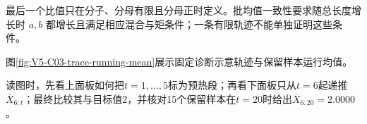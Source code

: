 \documentclass[UTF8,a4paper,11pt,openany]{ctexbook}
\begin{document}
\setcounter{page}{643}
\setcounter{chapter}{32}
\setcounter{figure}{7}
\pagestyle{headings}
最后一个比值只在分子、分母有限且分母正时定义。批均值一致性要求随总长度增长时 $a,b$ 都增长且满足相应混合与矩条件；一条有限轨迹不能单独证明这些条件。

图\ref{fig:V5-C03-trace-running-mean}展示固定诊断示意轨迹与保留样本运行均值。

\FloatBarrier
读图时，先看上面板如何把$t=1,\ldots,5$标为预热段；再看下面板只从$t=6$起递推$\overline X_{6:t}$；最终比较其与目标值2，并核对15个保留样本在$t=20$时给出$\overline X_{6:20}=2.0000$。
\end{document}
